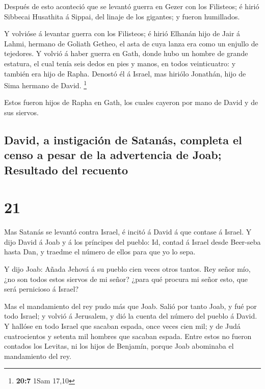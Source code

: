  Después de esto aconteció que se levantó guerra en Gezer
con los Filisteos; é hirió Sibbecai Husathita á Sippai, del linaje de
los gigantes; y fueron humillados.

 Y volvióse á levantar guerra con los Filisteos; é hirió
Elhanán hijo de Jair á Lahmi, hermano de Goliath Getheo, el asta de cuya
lanza era como un enjullo de tejedores.  Y volvió á haber
guerra en Gath, donde hubo un hombre de grande estatura, el cual tenía
seis dedos en pies y manos, en todos veinticuatro: y también era hijo de
Rapha.  Denostó él á Israel, mas hiriólo Jonathán, hijo de
Sima hermano de David. \footnote{\textbf{20:7} 1Sam 17,10}

 Estos fueron hijos de Rapha en Gath, los cuales cayeron por
mano de David y de sus siervos.

\hypertarget{david-a-instigaciuxf3n-de-satanuxe1s-completa-el-censo-a-pesar-de-la-advertencia-de-joab-resultado-del-recuento}{%
\subsection{David, a instigación de Satanás, completa el censo a pesar
de la advertencia de Joab; Resultado del
recuento}\label{david-a-instigaciuxf3n-de-satanuxe1s-completa-el-censo-a-pesar-de-la-advertencia-de-joab-resultado-del-recuento}}

\hypertarget{section-20}{%
\section{21}\label{section-20}}

 Mas Satanás se levantó contra Israel, é incitó á David á
que contase á Israel.  Y dijo David á Joab y á los príncipes
del pueblo: Id, contad á Israel desde Beer-seba hasta Dan, y traedme el
número de ellos para que yo lo sepa.

 Y dijo Joab: Añada Jehová á su pueblo cien veces otros
tantos. Rey señor mío, ¿no son todos estos siervos de mi señor? ¿para
qué procura mi señor esto, que será pernicioso á Israel?

 Mas el mandamiento del rey pudo más que Joab. Salió por
tanto Joab, y fué por todo Israel; y volvió á Jerusalem, y dió la cuenta
del número del pueblo á David.  Y hallóse en todo Israel que
sacaban espada, once veces cien mil; y de Judá cuatrocientos y setenta
mil hombres que sacaban espada.  Entre estos no fueron
contados los Levitas, ni los hijos de Benjamín, porque Joab abominaba el
mandamiento del rey.

